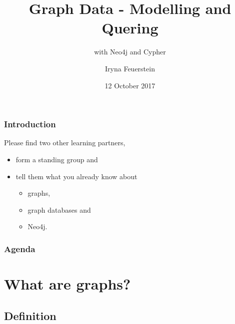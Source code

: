 \documentclass[12pt]{beamer}
\title{Graph Data - Modelling and Quering}
\subtitle{with Neo4j and Cypher}
\author[I.Feuerstein]{Iryna Feuerstein}
\institute[ODSC]{Open Data Science Conference}
\date{12 October 2017}
\begin{document}
    
    \begin{frame}
        \frametitle{Introduction}
        Please find two other learning partners, 
        \begin{itemize}
            \item form a standing group and 
            \item tell them what you already know about \begin{itemize}
                \item graphs, 
                \item graph databases and 
                \item Neo4j.
            \end{itemize}
        \end{itemize}
    \end{frame}
    
    \maketitle
    
    \begin{frame}
        \frametitle{Agenda}
        \tableofcontents
    \end{frame}
    
    \section{What are graphs?}
    \subsection{Definition}
    
\end{document}
